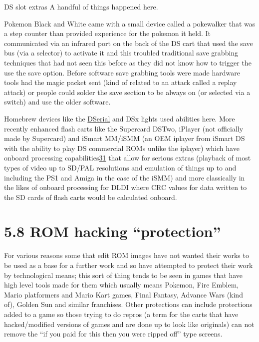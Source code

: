 \documentclass[
]{book}
\begin{document}
DS slot extras A handful of things happened here.

Pokemon Black and White came with a small device called a pokewalker that was a step counter than provided experience for the pokemon it held. It communicated via an infrared port on the back of the DS cart that used the save bus (via a selector) to activate it and this troubled traditional save grabbing techniques that had not seen this before as they did not know how to trigger the use the save option. Before software save grabbing tools were made hardware tools had the magic packet sent (kind of related to an attack called a replay attack) or people could solder the save section to be always on (or selected via a switch) and use the older software.

Homebrew devices like the \href{http://natrium42.com/wiki/DSerial}{DSerial} and DSx lights used abilities here. More recently enhanced flash carts like the Supercard DSTwo, iPlayer (not officially made by Supercard) and iSmart MM/iSMM (an OEM iplayer from iSmart DS with the ability to play DS commercial ROMs unlike the iplayer) which have onboard processing capabilities\href{romhacking202032.html\#fn31x0}{31} that allow for serious extras (playback of most types of video up to SD/PAL resolutions and emulation of things up to and including the PS1 and Amiga in the case of the iSMM) and more classically in the likes of onboard processing for DLDI where CRC values for data written to the SD cards of flash carts would be calculated onboard.

\hypertarget{rom-hacking-protection}{%
\section{5.8 ROM hacking ``protection''}\label{rom-hacking-protection}}

For various reasons some that edit ROM images have not wanted their works to be used as a base for a further work and so have attempted to protect their work by technological means; this sort of thing tends to be seen in games that have high level tools made for them which usually means Pokemon, Fire Emblem, Mario platformers and Mario Kart games, Final Fantasy, Advance Wars (kind of), Golden Sun and similar franchises. Other protections can include protections added to a game so those trying to do repros (a term for the carts that have hacked/modified versions of games and are done up to look like originals) can not remove the ``if you paid for this then you were ripped off'' type screens.
\end{document}
